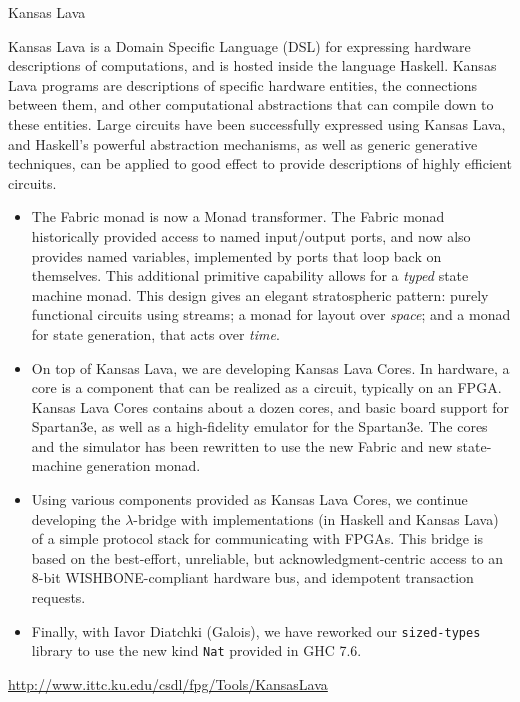 \begin{hcarentry}[updated]{Kansas Lava}
\label{klava}
\makeheader

Kansas Lava is a Domain Specific Language (DSL) for expressing
hardware descriptions of computations, and is hosted inside the
language Haskell. Kansas Lava programs are descriptions of specific hardware
entities, the connections between them, and other computational abstractions
that can compile down to these entities. Large circuits have been successfully
expressed using Kansas Lava, and Haskell's powerful abstraction mechanisms, as
well as generic generative techniques, can be applied to good effect to provide
descriptions of highly efficient circuits.

\begin{itemize}

\item The Fabric monad is now a Monad transformer.
The Fabric monad historically provided access to named input/output ports,
and now also provides named variables, implemented by ports that loop back on
themselves. This additional primitive capability allows for a {\em typed\/}
state machine monad.
This design gives an elegant stratospheric pattern: purely functional circuits using streams;
a monad for layout over {\em space\/}; and a monad for state generation,
that acts over {\em time\/}.

\item 
On top of Kansas Lava, we are developing Kansas Lava Cores.
In hardware, a core is a component
that can be realized as a circuit, typically on an FPGA. Kansas Lava Cores
contains about a dozen cores, and basic board support for Spartan3e,
as well as a high-fidelity emulator for the Spartan3e. The
cores and the simulator has been rewritten to use the new Fabric
and new state-machine generation monad.

\item Using various components provided as Kansas Lava Cores, 
we continue developing the $\lambda$-bridge 
with implementations (in Haskell and
Kansas Lava) of a simple protocol stack for communicating with FPGAs.
This bridge is based on the best-effort, unreliable,
but acknowledgment-centric access to an 8-bit WISHBONE-compliant hardware bus,
and idempotent transaction requests.

\item Finally, with Iavor Diatchki (Galois), we have reworked
our {\tt sized-types\/} library to use the new kind {\tt Nat} provided
in GHC 7.6.
\end{itemize}

\FurtherReading
  \url{http://www.ittc.ku.edu/csdl/fpg/Tools/KansasLava}
\end{hcarentry}
